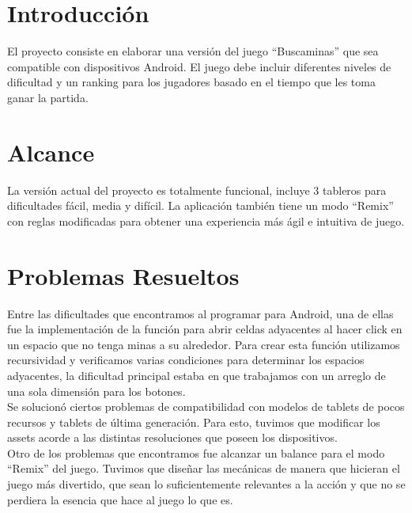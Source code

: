 \documentclass[12pt]{article}
\begin{document}
\section{Introducción}

El proyecto consiste en elaborar una versión del juego “Buscaminas” que sea compatible con dispositivos Android. El juego debe incluir diferentes niveles de dificultad y un ranking para los jugadores basado en el tiempo que les toma ganar la partida.




\section{Alcance}

	La versión actual del proyecto es totalmente funcional, incluye 3 tableros para dificultades fácil, media y difícil. La aplicación también tiene un modo “Remix” con reglas modificadas para obtener una experiencia más ágil e intuitiva de juego. 

	

\section{Problemas Resueltos}
	Entre las dificultades que encontramos al programar para Android, una de ellas fue la implementación de la función para abrir celdas adyacentes al hacer click en un espacio que no tenga minas a su alrededor. Para crear esta función utilizamos recursividad y verificamos varias condiciones para determinar los espacios adyacentes, la dificultad principal estaba en que trabajamos con un arreglo de una sola dimensión para los botones. 
\\Se solucionó ciertos problemas de compatibilidad con modelos de tablets de pocos recursos y tablets de última generación. Para esto, tuvimos que modificar los assets acorde a las distintas resoluciones que poseen los dispositivos.
\\Otro de los problemas que encontramos fue alcanzar un balance para el modo “Remix” del juego. Tuvimos que diseñar las mecánicas de manera que hicieran el juego más divertido, que sean lo suficientemente relevantes a la acción y que no se perdiera la esencia que hace  al juego lo que es. 

	
\end{document}
